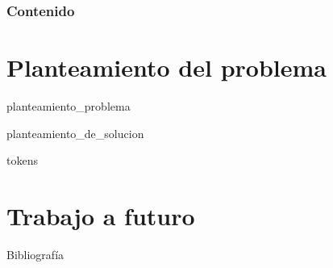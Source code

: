 \documentclass{beamer}
\begin{document}
  {
  \frame{\titlepage}}

  \begin{frame}
    \frametitle{Contenido}
    \setcounter{tocdepth}{1}
    \tableofcontents[pausesections]
  \end{frame}

  \setlength{\parskip}{0.5em}

  \section{Planteamiento del problema}

  {planteamiento_problema}

  {planteamiento_de_solucion}

  {tokens}

  \section{Trabajo a futuro}

  \begin{frame}{}

  \end{frame}

  \begin{frame}[allowframebreaks]{Bibliografía}
    \printbibliography
  \end{frame}

  \setlength{\parskip}{0.0em}

  {
  \frame{\titlepage}}
\end{document}
